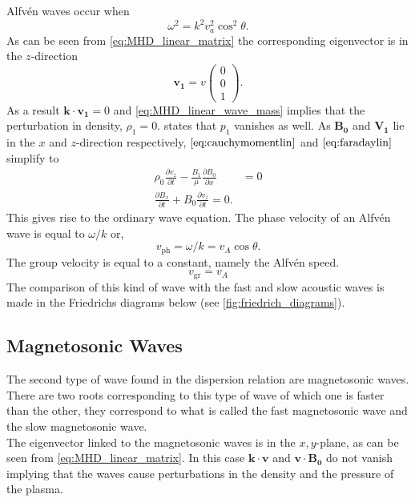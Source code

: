 \documentclass[a4paper]{article}
\numberwithin{figure}{section}
\numberwithin{equation}{section}
\begin{document}
Alfv\'en waves occur when \[
\omega^2 = k^2v_a^2\cos^2 \theta
.\] 
As can be seen from \cref{eq:MHD_linear_matrix} the corresponding eigenvector is in the $z$-direction \[
	\mathbf{v_1} = v \begin{pmatrix} 0 \\ 0 \\ 1 \end{pmatrix} 
.\] 
As a result $\mathbf k \cdot \mathbf{v_1} = 0$ and \cref{eq:MHD_linear_wave_mass} implies that the perturbation in density, $\rho_1  = 0$.  states that $p_1$ vanishes as well. 
As $\mathbf{B_0}$  and $\mathbf{V_1}$ lie in the $x$ and $z$-direction respectively, $\cref{eq:cauchymomentlin}$ and $\cref{eq:faradaylin}$ simplify to
\begin{align*}
	\rho_0 \frac{\partial v_z}{\partial t} - \frac{B_1}{\mu} \frac{\partial B_0}{\partial x} &= 0 \\
	\frac{\partial B_x}{\partial t}  + B_0\frac{\partial v_z}{\partial t}  = 0
.\end{align*}
This gives rise to the ordinary wave equation. 
The phase velocity of an Alfv\'en wave is equal to $\omega/k$ or,
\begin{equation*}
    v_{\text{ph}} = \omega/k = v_A \cos\theta.
\end{equation*}
The group velocity is equal to a constant, namely the Alfv\'en speed.
\begin{equation*}
    v_{\text{gr}} = v_A
\end{equation*}
The comparison of this kind of wave with the fast and slow acoustic waves is made in the Friedrichs diagrams below (see \cref{fig:friedrich_diagrams}).
\subsection{Magnetosonic Waves}
The second type of wave found in the dispersion relation are magnetosonic waves. There are two roots corresponding to this type of wave of which one is faster than the other, they correspond to what is called the fast magnetosonic wave and the slow magnetosonic wave.\\

The eigenvector linked to the magnetosonic waves is in the $x,y$-plane, as can be seen from \cref{eq:MHD_linear_matrix}.
In this case $\mathbf{k\cdot v}$ and $\mathbf{v \cdot B_0}$ do not vanish implying that the waves cause perturbations in the density and the pressure of the plasma.
\end{document}
